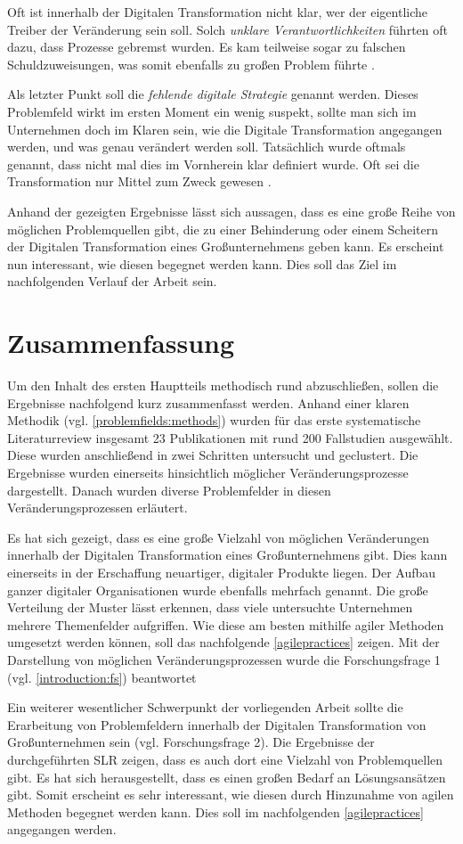 Oft ist innerhalb der Digitalen Transformation nicht klar, wer der eigentliche  Treiber der Veränderung sein soll. Solch \textit{unklare Verantwortlichkeiten} führten oft dazu, dass Prozesse gebremst wurden. Es kam teilweise sogar zu falschen Schuldzuweisungen, was somit ebenfalls zu großen Problem führte \cite[S. 24]{buhse_transformationswerk_2016}.

Als letzter Punkt soll die \textit{fehlende digitale Strategie} genannt werden. Dieses Problemfeld wirkt im ersten Moment ein wenig suspekt, sollte man sich im Unternehmen doch im Klaren sein, wie die Digitale Transformation angegangen werden, und was genau verändert werden soll. Tatsächlich wurde oftmals genannt, dass nicht mal dies im Vornherein klar definiert wurde. Oft sei die Transformation nur Mittel zum Zweck gewesen \cite[S. 249]{oswald_shaping_2017}.

Anhand der gezeigten Ergebnisse lässt sich aussagen, dass es eine große Reihe von möglichen Problemquellen gibt, die zu einer Behinderung oder einem Scheitern der Digitalen Transformation eines Großunternehmens geben kann. Es erscheint nun interessant, wie diesen begegnet werden kann. Dies soll das Ziel im nachfolgenden Verlauf der Arbeit sein.

\section{Zusammenfassung}

Um den Inhalt des ersten Hauptteils methodisch rund abzuschließen, sollen die Ergebnisse nachfolgend kurz zusammenfasst werden. Anhand einer klaren Methodik (vgl. \ref{problemfields:methods}) wurden für das erste systematische Literaturreview insgesamt 23 Publikationen mit rund 200 Fallstudien ausgewählt. Diese wurden anschließend in zwei Schritten untersucht und geclustert. Die Ergebnisse wurden einerseits hinsichtlich möglicher Veränderungsprozesse dargestellt. Danach wurden diverse Problemfelder in diesen Veränderungsprozessen erläutert.

Es hat sich gezeigt, dass es eine große Vielzahl von möglichen Veränderungen innerhalb der Digitalen Transformation eines Großunternehmens gibt. Dies kann einerseits in der Erschaffung neuartiger, digitaler Produkte liegen. Der Aufbau ganzer digitaler Organisationen wurde ebenfalls mehrfach genannt. Die große Verteilung der Muster lässt erkennen, dass viele untersuchte Unternehmen mehrere Themenfelder aufgriffen. Wie diese am besten mithilfe agiler Methoden umgesetzt werden können, soll das nachfolgende \ref{agilepractices} zeigen. Mit der Darstellung von möglichen Veränderungsprozessen wurde die Forschungsfrage 1 (vgl. \ref{introduction:fs}) beantwortet

Ein weiterer wesentlicher Schwerpunkt der vorliegenden Arbeit sollte die Erarbeitung von Problemfeldern innerhalb der Digitalen Transformation von Großunternehmen sein (vgl. Forschungsfrage 2). Die Ergebnisse der durchgeführten SLR zeigen, dass es auch dort eine Vielzahl von Problemquellen gibt. Es hat sich herausgestellt, dass es einen großen Bedarf an Lösungsansätzen gibt. Somit erscheint es sehr interessant, wie diesen durch Hinzunahme von agilen Methoden begegnet werden kann. Dies soll im nachfolgenden \ref{agilepractices} angegangen werden.


